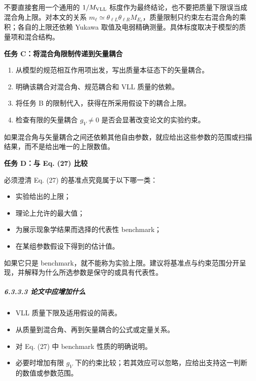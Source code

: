 \documentclass[
]{article}
\providecommand{\tightlist}{%
  \setlength{\itemsep}{0pt}\setlength{\parskip}{0pt}}
\begin{document}
不要直接套用一个通用的 \(1/M_{\rm VLL}\)
标度作为最终结论，也不要把质量下限误当成混合角上限。对本文的关系
\(m_\ell\simeq\theta_{\ell L}\theta_{\ell R}M_{E_\ell}\)，质量限制只约束左右混合角的乘积；各自的上限还依赖
Yukawa 取值及电弱精确测量。具体标度取决于模型的质量项和混合结构。

\textbf{任务 C：将混合角限制传递到矢量耦合}

\begin{enumerate}
\def\labelenumi{\arabic{enumi}.}
\tightlist
\item
  从模型的规范相互作用项出发，写出质量本征态下的矢量耦合。
\item
  明确该耦合对混合角、规范耦合和 VLL 质量的依赖。
\item
  将任务 B 的限制代入，获得在所采用假设下的耦合上限。
\item
  检查有限的矢量耦合 \(g_V\neq 0\) 是否会显著改变论文的实验约束。
\end{enumerate}

如果混合角与矢量耦合之间还依赖其他自由参数，就应给出这些参数的范围或扫描结果，而不是给出唯一的上限数值。

\textbf{任务 D：与 Eq. (27) 比较}

必须澄清 Eq. (27) 的基准点究竟属于以下哪一类：

\begin{itemize}
\tightlist
\item
  实验给出的上限；
\item
  理论上允许的最大值；
\item
  为展示现象学结果而选择的代表性 benchmark；
\item
  在某组参数假设下得到的估计值。
\end{itemize}

如果它只是
benchmark，就不能称为实验上限。建议将基准点与约束范围分开呈现，并解释为什么所选参数是保守的或具有代表性。

\subparagraph{6.3.3.3
论文中应增加什么}\label{ux8bbaux6587ux4e2dux5e94ux589eux52a0ux4ec0ux4e48-2}

\begin{itemize}
\tightlist
\item
  VLL 质量下限及适用假设的简表。
\item
  从质量到混合角、再到矢量耦合的公式或定量关系。
\item
  对 Eq. (27) 中 benchmark 性质的明确说明。
\item
  必要时增加有限 \(g_V\)
  下的约束比较；若其效应可以忽略，应给出支持这一判断的数值或参数范围。
\end{itemize}
\end{document}
